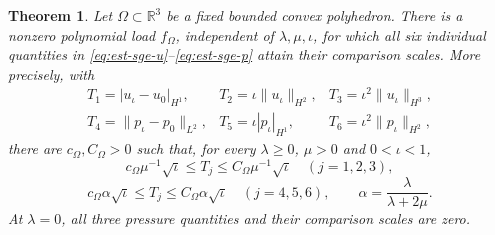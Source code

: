 \documentclass[11pt,a4paper]{article}
\newtheorem{theorem}{Theorem}[section]
\theoremstyle{remark}
\numberwithin{equation}{section}
\begin{document}
\begin{theorem}\label{thm:est-sharpness}
Let $\Omega\subset\mathbb R^3$ be a fixed bounded convex polyhedron.
There is a nonzero polynomial load $f_\Omega$, independent of
$\lambda,\mu,\iota$, for which all six individual quantities in
\eqref{eq:est-sge-u}--\eqref{eq:est-sge-p} attain their comparison scales. More precisely, with
\[
\begin{array}{lll}
 T_1=|u_\iota-u_0|_{H^1},&T_2=\iota\|u_\iota\|_{H^2},
       &T_3=\iota^2\|u_\iota\|_{H^3},\\
 T_4=\|p_\iota-p_0\|_{L^2},&T_5=\iota|p_\iota|_{H^1},
       &T_6=\iota^2\|p_\iota\|_{H^2},
\end{array}
\]
there are $c_\Omega,C_\Omega>0$ such that, for every
$\lambda\ge0$, $\mu>0$ and $0<\iota<1$,
\[
 c_\Omega\mu^{-1}\sqrt\iota\le T_j
       \le C_\Omega\mu^{-1}\sqrt\iota\quad(j=1,2,3),
\]
\[
 c_\Omega\alpha\sqrt\iota\le T_j
       \le C_\Omega\alpha\sqrt\iota\quad(j=4,5,6),
 \qquad \alpha=\frac{\lambda}{\lambda+2\mu}.
\]
At $\lambda=0$, all three pressure quantities and their comparison
scales are zero.
\end{theorem}
\end{document}
